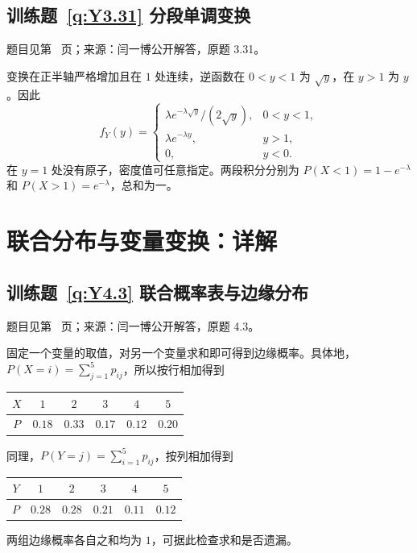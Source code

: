 \subsection*{训练题~\ref{q:Y3.31} 分段单调变换}\label{a:Y3.31}{\small 题目见第~\pageref{q:Y3.31} 页；来源：闫一博公开解答，原题 3.31。}
\begin{solve}变换在正半轴严格增加且在 $1$ 处连续，逆函数在 $0<y<1$ 为 $\sqrt y$，在 $y>1$ 为 $y$。因此\[f_Y(y)=\begin{cases}\lambda e^{-\lambda\sqrt y}/(2\sqrt y),&0<y<1,\\\lambda e^{-\lambda y},&y>1,\\0,&y<0.\end{cases}\]在 $y=1$ 处没有原子，密度值可任意指定。两段积分分别为 $P(X<1)=1-e^{-\lambda}$ 和 $P(X>1)=e^{-\lambda}$，总和为一。\end{solve}

\clearpage\section*{联合分布与变量变换：详解}

\subsection*{训练题~\ref{q:Y4.3} 联合概率表与边缘分布}\label{a:Y4.3}{\small 题目见第~\pageref{q:Y4.3} 页；来源：闫一博公开解答，原题 4.3。}
\begin{solve}固定一个变量的取值，对另一个变量求和即可得到边缘概率。具体地，$P(X=i)=\sum_{j=1}^5p_{ij}$，所以按行相加得到
\begin{center}
    
    \begin{tabular}{|c|c|c|c|c|c|} \hline 
         $X$&  $1$& $2$&$3$& $4$&$5$\\ \hline 
         $P$& 
     $0.18$& $0.33$& $0.17$& $0.12$&$0.20$\\ \hline\end{tabular}

\end{center}
同理，$P(Y=j)=\sum_{i=1}^5p_{ij}$，按列相加得到\begin{center}
    
    \begin{tabular}{|c|c|c|c|c|c|} \hline 
         $Y$&  $1$& $2$&$3$& $4$&$5$\\ \hline 
         $P$& 
     $0.28$& $0.28$& $0.21$& $0.11$&$0.12$\\ \hline\end{tabular}

\end{center}

两组边缘概率各自之和均为 $1$，可据此检查求和是否遗漏。\end{solve}

